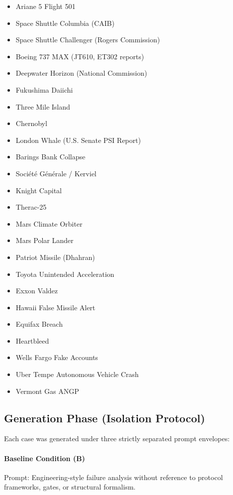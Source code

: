 \begin{itemize}
    \item Ariane 5 Flight 501
    \item Space Shuttle Columbia (CAIB)
    \item Space Shuttle Challenger (Rogers Commission)
    \item Boeing 737 MAX (JT610, ET302 reports)
    \item Deepwater Horizon (National Commission)
    \item Fukushima Daiichi
    \item Three Mile Island
    \item Chernobyl
    \item London Whale (U.S. Senate PSI Report)
    \item Barings Bank Collapse
    \item Société Générale / Kerviel
    \item Knight Capital
    \item Therac-25
    \item Mars Climate Orbiter
    \item Mars Polar Lander
    \item Patriot Missile (Dhahran)
    \item Toyota Unintended Acceleration
    \item Exxon Valdez
    \item Hawaii False Missile Alert
    \item Equifax Breach
    \item Heartbleed
    \item Wells Fargo Fake Accounts
    \item Uber Tempe Autonomous Vehicle Crash
    \item Vermont Gas ANGP
\end{itemize}

\subsection{Generation Phase (Isolation Protocol)}

Each case was generated under three strictly separated prompt envelopes:

\paragraph{Baseline Condition (B)}
Prompt: Engineering-style failure analysis without reference to protocol frameworks, gates, or structural formalism.

